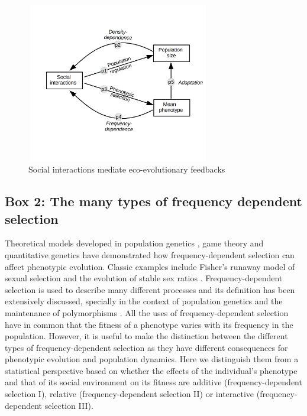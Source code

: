 \documentclass{article}
\begin{document}
\begin{figure}[H]
	\centering
	\includegraphics[width=8cm, height=7cm]{Figures/Fig1.jpg}
	\caption{Social interactions mediate eco-evolutionary feedbacks}
\end{figure}


\newpage
\subsection{Box 2: The many types of frequency dependent selection} 
\noindent Theoretical models developed in population genetics \citep{Fisher1930, Wright1969}, game theory \citep{MaynardSmith1982, McGill2007, McNamaraLeimar2020} and quantitative genetics \citep{Lande1976, Lande2007, Engen2020} have demonstrated how frequency-dependent selection can affect phenotypic evolution. Classic examples include Fisher's runaway model of sexual selection and the evolution of stable sex ratios \citep{Fisher1930}. Frequency-dependent selection is used to describe many different processes and its definition has been extensively discussed, specially in the context of population genetics and the maintenance of polymorphisms \citep{Ayala1974, Gromko1977, Heino1998}. All the uses of frequency-dependent selection have in common that the fitness of a phenotype varies with its frequency in the population. However, it is useful to make the distinction between the different types of frequency-dependent selection as they have different consequences for phenotypic evolution and population dynamics. Here we distinguish them from a statistical perspective based on whether the effects of the individual's phenotype and that of its social environment on its fitness are additive (frequency-dependent selection I), relative (frequency-dependent selection II) or interactive (frequency-dependent selection III).
\end{document}
